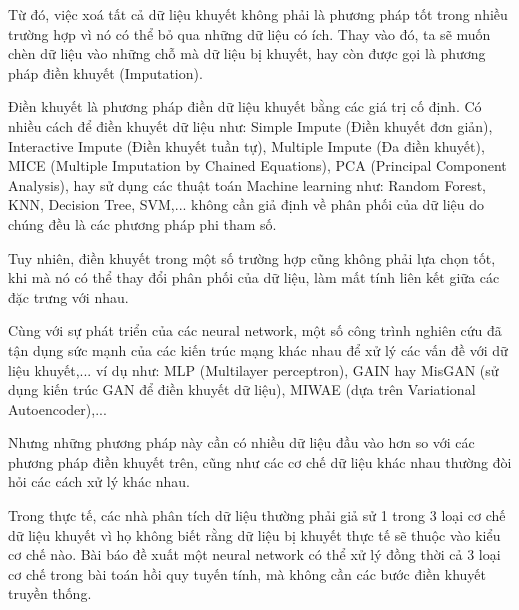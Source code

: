 Từ đó, việc xoá tất cả dữ liệu khuyết không phải là phương pháp tốt trong nhiều trường hợp vì nó có thể bỏ qua những dữ liệu có ích. Thay vào đó, ta sẽ muốn chèn dữ liệu vào những chỗ mà dữ liệu bị khuyết, hay còn được gọi là phương pháp điền khuyết (Imputation).

Điền khuyết
là phương pháp điền dữ liệu khuyết bằng các giá trị cố định. Có nhiều cách để điền khuyết dữ liệu như: Simple Impute (Điền khuyết đơn giản), Interactive Impute (Điền khuyết tuần tự), Multiple Impute (Đa điền khuyết), MICE (Multiple Imputation by Chained Equations), PCA (Principal Component Analysis), hay sử dụng các thuật toán Machine learning như: Random Forest, KNN, Decision Tree, SVM,... không cần giả định về phân phối của dữ liệu do chúng đều là các phương pháp phi tham số.

Tuy nhiên, điền khuyết trong một số trường hợp cũng không phải lựa chọn tốt, khi mà nó có thể thay đổi phân phối của dữ liệu, làm mất tính liên kết giữa các đặc trưng với nhau.

Cùng với sự phát triển của các neural network, một số công trình nghiên cứu đã tận dụng sức mạnh của các kiến trúc mạng khác nhau để xử lý các vấn đề với dữ liệu khuyết,...
ví dụ như: 
MLP (Multilayer perceptron), 
GAIN hay MisGAN (sử dụng kiến trúc GAN để điền khuyết dữ liệu), 
MIWAE (dựa trên Variational Autoencoder),... 

Nhưng những phương pháp này cần có nhiều dữ liệu đầu vào hơn so với các phương pháp điền khuyết trên, cũng như các cơ chế dữ liệu khác nhau thường đòi hỏi các cách xử lý khác nhau.

Trong thực tế, các nhà phân tích dữ liệu thường phải giả sử 1 trong 3 loại cơ chế dữ liệu khuyết vì họ không biết rằng dữ liệu bị khuyết thực tế sẽ thuộc vào kiểu cơ chế nào. Bài báo \cite{le2020neumiss} đề xuất một neural network có thể xử lý đồng thời cả 3 loại cơ chế trong bài toán hồi quy tuyến tính, mà không cần các bước điền khuyết truyền thống.
